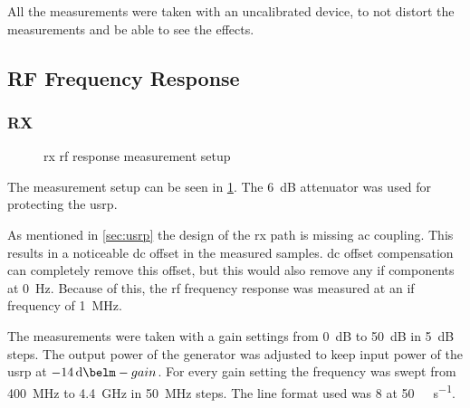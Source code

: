 \documentclass[12pt,a4paper,parskip=full,abstracton]{scrartcl}
\begin{document}
All the measurements were taken with an uncalibrated device, to not distort the measurements
and be able to see the effects.

\subsection{RF Frequency Response}
\subsubsection{RX}
\label{sec:rfrx}
\begin{figure}[htb]
    \centering
    \caption{\gls{rx} \gls{rf} response measurement setup}
    \label{fig:rxrfsetup}
\end{figure}

The measurement setup can be seen in \cref{fig:rxrfsetup}. The \SI{6}{\deci\bel}
attenuator was used for protecting the \gls{usrp}.

As mentioned in \cref{sec:usrp} the design of the \gls{rx} path is missing \gls{ac}
coupling. This results in a noticeable \gls{dc} offset in the measured samples.
\gls{dc} offset compensation can completely remove this offset, but this would
also remove any \gls{if} components at \SI{0}{\hertz}. Because of this, the
\gls{rf} frequency response was measured at an \gls{if} frequency of
\SI{1}{\mega\hertz}.

The measurements were taken with a gain settings from \SI{0}{\deci\bel} to
\SI{50}{\deci\bel} in \SI{5}{\deci\bel} steps. The output power of the
generator was adjusted to keep input power of the \gls{usrp} at
$\SI{-14}{\deci\belm} - gain$. For every gain setting the
frequency was swept from \SI{400}{\mega\hertz} to \SI{4.4}{\giga\hertz} in
\SI{50}{\mega\hertz} steps. The line format used was \SI{8}{\bit} at
\SI{50}{\mega\samples\per\second}.
\end{document}
